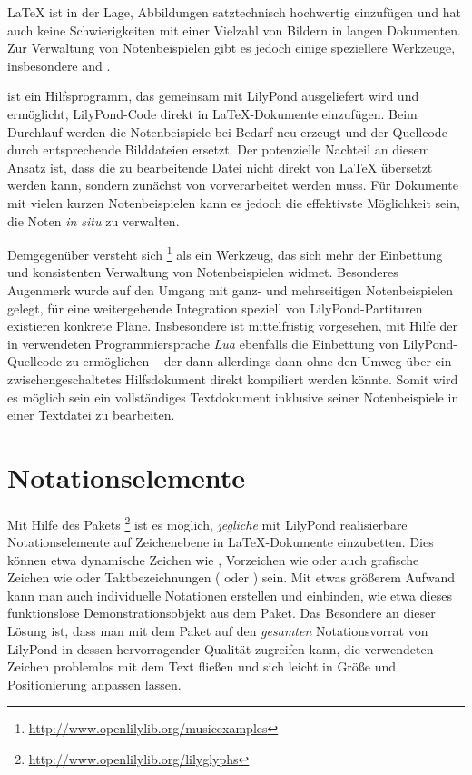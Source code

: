 \documentclass[DIV=12]{scrreprt}
\begin{document}
\LaTeX{} ist in der Lage, Abbildungen satztechnisch hochwertig einzufügen und hat auch keine Schwierigkeiten mit einer Vielzahl von Bildern in langen Dokumenten.
Zur Verwaltung von Notenbeispielen gibt es jedoch einige speziellere Werkzeuge, insbesondere  and .

 ist ein Hilfsprogramm, das gemeinsam mit LilyPond ausgeliefert wird und ermöglicht, LilyPond-Code direkt in \LaTeX-Dokumente einzufügen.
Beim Durchlauf werden die Notenbeispiele bei Bedarf neu erzeugt und der Quellcode durch entsprechende Bilddateien ersetzt.
Der potenzielle Nachteil an diesem Ansatz ist, dass die zu bearbeitende Datei nicht direkt von \LaTeX{} übersetzt werden kann, sondern zunächst von  vorverarbeitet werden muss.
Für Dokumente mit vielen kurzen Notenbeispielen kann es jedoch die effektivste Möglichkeit sein, die Noten \emph{in situ} zu verwalten.

Demgegenüber versteht sich %
\footnote{\url{http://www.openlilylib.org/musicexamples}} 
als ein Werkzeug, das sich mehr der Einbettung und konsistenten Verwaltung von Notenbeispielen widmet.
Besonderes Augenmerk wurde auf den Umgang mit ganz- und mehrseitigen Notenbeispielen gelegt, für eine weitergehende Integration speziell von LilyPond-Partituren existieren konkrete Pläne.
Insbesondere ist mittelfristig vorgesehen, mit Hilfe der in  verwendeten Programmiersprache \emph{Lua} ebenfalls die Einbettung von LilyPond-Quellcode zu ermöglichen -- der dann allerdings dann ohne den Umweg über ein zwischengeschaltetes Hilfsdokument direkt kompiliert werden könnte.
Somit wird es möglich sein ein vollständiges Textdokument inklusive seiner Notenbeispiele in einer Textdatei zu bearbeiten.

\section{Notationselemente}
\label{sec:pt_notational-elements}
Mit Hilfe des Pakets \lilyglyphs%
\footnote{\url{http://www.openlilylib.org/lilyglyphs}}
ist es möglich, \emph{jegliche} mit LilyPond realisierbare Notationselemente auf Zeichenebene in \LaTeX-Dokumente einzubetten.
Dies können etwa dynamische Zeichen wie , Vorzeichen wie  \flatflat{} oder auch grafische Zeichen wie \crescHairpin{} oder Taktbezeichnungen ( oder \lilyTimeCHalf) sein.
Mit etwas größerem Aufwand kann man auch individuelle Notationen erstellen und einbinden, wie etwa dieses funktionslose \fancyExample{} Demonstrationsobjekt aus dem Paket.
Das Besondere an dieser Lösung ist, dass man mit dem Paket auf den \emph{gesamten} Notationsvorrat von LilyPond in dessen hervorragender Qualität zugreifen kann, die verwendeten Zeichen problemlos mit dem Text fließen und sich leicht in Größe und Positionierung anpassen lassen.
\end{document}

